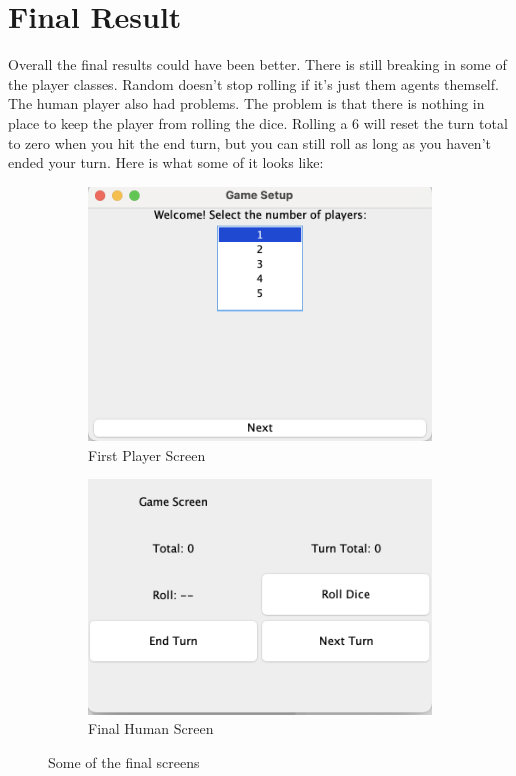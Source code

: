 \documentclass[a4paper,11pt]{article}
\begin{document}
\section*{Final Result}
Overall the final results could have been better. There is still breaking in some of the player classes. Random doesn't stop rolling if it's just them agents themself. The human player also had problems. The problem is that there is nothing in place to keep the player from rolling the dice. Rolling a 6 will reset the turn total to zero when you hit the end turn, but you can still roll as long as you haven't ended your turn.
Here is what some of it looks like:
\begin{figure}[h]
    \centering
    \begin{subfigure}{0.45\textwidth}
        \centering
        \includegraphics[width=\textwidth]{Image3.png}
        \caption{First Player Screen}
        \label{fig:first}
    \end{subfigure}
    \hfill
    \begin{subfigure}{0.45\textwidth}
        \centering
        \includegraphics[width=\textwidth]{Image4.png}
        \caption{Final Human Screen}
        \label{fig:second}
    \end{subfigure}
    \caption{Some of the final screens}
    \label{fig:two_images}
\end{figure}
\end{document}
